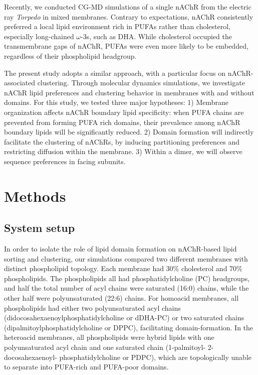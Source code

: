 Recently, we \citep{Sharp2019} conducted CG-MD simulations of a single nAChR from the electric ray {\it Torpedo} in mixed membranes. Contrary to expectations, nAChR consistently preferred a local lipid environment rich in PUFAs rather than cholesterol, especially long-chained $\omega$-3s, such as DHA. While cholesterol occupied the transmembrane gaps of nAChR, PUFAs were even more likely to be embedded, regardless of their phospholipid headgroup. 

The present study adopts a similar approach, with a particular focus on nAChR-associated clustering. Through molecular dynamics simulations, we investigate nAChR lipid preferences and clustering behavior in membranes with and without domains. For this study, we tested three major hypotheses: 1) Membrane organization affects nAChR boundary lipid specificity: when PUFA chains are prevented from forming PUFA rich domains, their prevalence among nAChR boundary lipids will be significantly reduced. 2) Domain formation will indirectly facilitate the clustering of nAChRs, by inducing partitioning preferences and restricting diffusion within the membrane. 3) Within a dimer, we will observe sequence preferences in facing subunits.
\section{Methods}
\subsection{System setup}

In order to isolate the role of lipid domain formation on nAChR-based lipid sorting and clustering, our simulations compared two different membranes with distinct phospholipid topology. Each membrane had 30\% cholesterol and 70\% phospholipids.  The phospholipids all had phosphatidylcholine (PC) headgroups, and half the total number of acyl chains were saturated (16:0) chains, while the other half were polyunsaturated (22:6) chains.  For homoacid membranes, all phospholipids had either two polyunsaturated acyl chains (didocosahexaenoylphosphatidylcholine or dDHA-PC) or two saturated chains (dipalmitoylphosphatidylcholine or DPPC), facilitating domain-formation. In the heteroacid membranes, all phospholipids were hybrid lipids with one polyunsaturated acyl chain and one saturated chain (1-palmitoyl- 2-docosahexaenoyl- phosphatidylcholine or PDPC), which are topologically unable to separate into PUFA-rich and PUFA-poor domains. 

